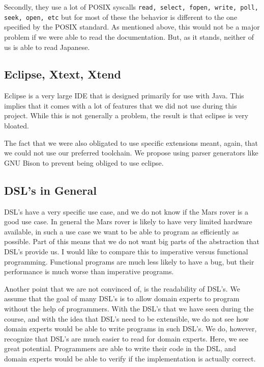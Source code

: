 \documentclass{scrartcl}
\begin{document}
Secondly, they use a lot of POSIX syscalls \texttt{read, select, fopen, write, poll, seek, open, etc} but for most of these the behavior is different to the one specified by the POSIX standard.
As mentioned above, this would not be a major problem if we were able to read the documentation.
But, as it stands, neither of us is able to read Japanese.

\subsection{Eclipse, Xtext, Xtend}
Eclipse is a very large IDE that is designed primarily for use with Java.
This implies that it comes with a lot of features that we did not use during this project.
While this is not generally a problem, the result is that eclipse is very bloated.

The fact that we were also obligated to use specific extensions meant, again, that we could not use our preferred toolchain.
We propose using parser generators like GNU Bison to prevent being obliged to use eclipse.

\subsection{DSL's in General}
DSL's have a very specific use case, and we do not know if the Mars rover is a good use case.
In general the Mars rover is likely to have very limited hardware available, in such a use case we want to be able to program as efficiently as possible.
Part of this means that we do not want big parts of the abstraction that DSL's provide us.
I would like to compare this to imperative versus functional programming.
Functional programs are much less likely to have a bug, but their performance is much worse than imperative programs.

Another point that we are not convinced of, is the readability of DSL's.
We assume that the goal of many DSL's is to allow domain experts to program without the help of programmers.
With the DSL's that we have seen during the course, and with the idea that DSL's need to be extensible, we do not see how domain experts would be able to write programs in such DSL's.
We do, however, recognize that DSL's are much easier to read for domain experts.
Here, we see great potential.
Programmers are able to write their code in the DSL, and domain experts would be able to verify if the implementation is actually correct.
\end{document}

